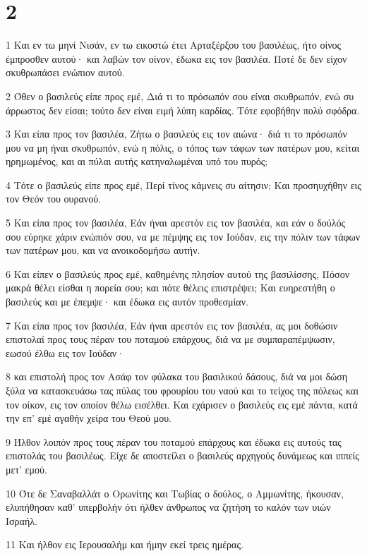 \chapter{2}

\par 1 Και εν τω μηνί Νισάν, εν τω εικοστώ έτει Αρταξέρξου του βασιλέως, ήτο οίνος έμπροσθεν αυτού· και λαβών τον οίνον, έδωκα εις τον βασιλέα. Ποτέ δε δεν είχον σκυθρωπάσει ενώπιον αυτού.
\par 2 Όθεν ο βασιλεύς είπε προς εμέ, Διά τι το πρόσωπόν σου είναι σκυθρωπόν, ενώ συ άρρωστος δεν είσαι; τούτο δεν είναι ειμή λύπη καρδίας. Τότε εφοβήθην πολύ σφόδρα.
\par 3 Και είπα προς τον βασιλέα, Ζήτω ο βασιλεύς εις τον αιώνα· διά τι το πρόσωπόν μου να μη ήναι σκυθρωπόν, ενώ η πόλις, ο τόπος των τάφων των πατέρων μου, κείται ηρημωμένος, και αι πύλαι αυτής κατηναλωμέναι υπό του πυρός;
\par 4 Τότε ο βασιλεύς είπε προς εμέ, Περί τίνος κάμνεις συ αίτησιν; Και προσηυχήθην εις τον Θεόν του ουρανού.
\par 5 Και είπα προς τον βασιλέα, Εάν ήναι αρεστόν εις τον βασιλέα, και εάν ο δούλός σου εύρηκε χάριν ενώπιόν σου, να με πέμψης εις τον Ιούδαν, εις την πόλιν των τάφων των πατέρων μου, και να ανοικοδομήσω αυτήν.
\par 6 Και είπεν ο βασιλεύς προς εμέ, καθημένης πλησίον αυτού της βασιλίσσης, Πόσον μακρά θέλει είσθαι η πορεία σου; και πότε θέλεις επιστρέψει; Και ευηρεστήθη ο βασιλεύς και με έπεμψε· και έδωκα εις αυτόν προθεσμίαν.
\par 7 Και είπα προς τον βασιλέα, Εάν ήναι αρεστόν εις τον βασιλέα, ας μοι δοθώσιν επιστολαί προς τους πέραν του ποταμού επάρχους, διά να με συμπαραπέμψωσιν, εωσού έλθω εις τον Ιούδαν·
\par 8 και επιστολή προς τον Ασάφ τον φύλακα του βασιλικού δάσους, διά να μοι δώση ξύλα να κατασκευάσω τας πύλας του φρουρίου του ναού και το τείχος της πόλεως και τον οίκον, εις τον οποίον θέλω εισέλθει. Και εχάρισεν ο βασιλεύς εις εμέ πάντα, κατά την επ' εμέ αγαθήν χείρα του Θεού μου.
\par 9 Ήλθον λοιπόν προς τους πέραν του ποταμού επάρχους και έδωκα εις αυτούς τας επιστολάς του βασιλέως. Είχε δε αποστείλει ο βασιλεύς αρχηγούς δυνάμεως και ιππείς μετ' εμού.
\par 10 Ότε δε Σαναβαλλάτ ο Ορωνίτης και Τωβίας ο δούλος, ο Αμμωνίτης, ήκουσαν, ελυπήθησαν καθ' υπερβολήν ότι ήλθεν άνθρωπος να ζητήση το καλόν των υιών Ισραήλ.
\par 11 Και ήλθον εις Ιερουσαλήμ και ήμην εκεί τρεις ημέρας.

